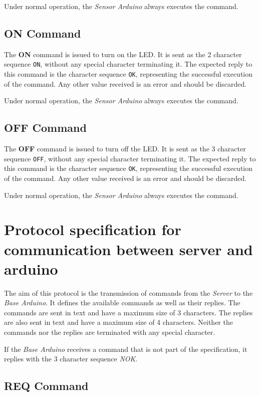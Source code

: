 \documentclass[conference, a4paper]{IEEEtran}
\begin{document}
Under normal operation, the \textit{Sensor Arduino} always executes the command.

\subsection{ON Command}

The \textbf{ON} command is issued to turn on the LED. It is sent as the 2 character sequence \texttt{ON}, without any special character terminating it. The expected reply to this command is the character sequence \texttt{OK}, representing the successful execution of the command. Any other value received is an error and should be discarded.

Under normal operation, the \textit{Sensor Arduino} always executes the command.

\subsection{OFF Command}

The \textbf{OFF} command is issued to turn off the LED. It is sent as the 3 character sequence \texttt{OFF}, without any special character terminating it. The expected reply to this command is the character sequence \texttt{OK}, representing the successful execution of the command. Any other value received is an error and should be discarded.

Under normal operation, the \textit{Sensor Arduino} always executes the command.

\section{Protocol specification for communication between server and arduino}
\label{prot_serv}

The aim of this protocol is the transmission of commands from the \textit{Server} to the \textit{Base Arduino}. It defines the available commands as well as their replies. The commands are sent in text and have a maximum size of 3 characters. The replies are also sent in text and have a maximum size of 4 characters. Neither the commands nor the replies are terminated with any special character.

If the \textit{Base Arduino} receives a command that is not part of the specification, it replies with the 3 character sequence \textit{NOK}.

\subsection{REQ Command}
\end{document}

